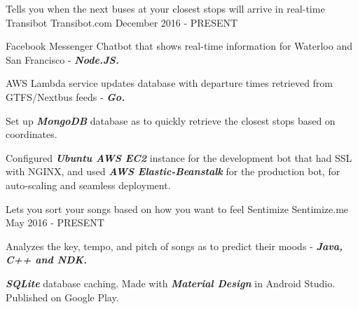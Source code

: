 \begin{cventries}
	\cventry
    {Tells you when the next buses at your closest stops will arrive in real-time}
    {Transibot}
    {Transibot.com}
    {December 2016 - PRESENT}
    {
      \begin{cvitems}
        \item {Facebook Messenger Chatbot that shows real-time information for Waterloo and San Francisco - \textbf{\textit{Node.JS.}}}
        \item {AWS Lambda service updates database with departure times retrieved from GTFS/Nextbus feeds - \textbf{\textit{Go.}}}
        \item {Set up \textbf{\textit{MongoDB}} database as to quickly retrieve the closest stops based on coordinates.}
        \item {Configured \textbf{\textit{Ubuntu AWS EC2}} instance for the development bot that had SSL with NGINX, and used \textbf{\textit{AWS Elastic-Beanstalk}} for the production bot, for auto-scaling and seamless deployment.}
      \end{cvitems}
    }
  \cventry
    {Lets you sort your songs based on how you want to feel}
    {Sentimize}
    {Sentimize.me}
    {May 2016 - PRESENT}
    {
      \begin{cvitems}
        \item {Analyzes the key, tempo, and pitch of songs as to predict their moods - \textbf{\textit{Java, C++ and NDK.}}}
        \item {\textbf{\textit{SQLite}} database caching. Made with \textbf{\textit{Material Design}} in Android Studio. Published on Google Play.}
      \end{cvitems}
    }
\end{cventries}
